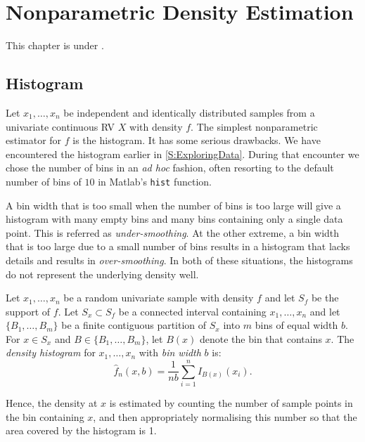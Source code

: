 \chapter{Nonparametric Density Estimation}
This chapter is under \work.
\section{Histogram}
Let $x_1,\ldots,x_n$ be independent and identically distributed samples from a univariate continuous RV $X$ with density $f$. The simplest nonparametric estimator for $f$ is the histogram.  It has some serious drawbacks.  We have encountered the histogram earlier in \ref{S:ExploringData}.  During that encounter we chose the number of bins in an {\em ad hoc} fashion, often resorting to the default number of bins of $10$ in {\sc Matlab}'s {\tt hist} function.

A bin width that is too small when the number of bins is too large will give a histogram with many empty bins and many bins containing only a single data point.  This is referred as {\em under-smoothing}.  At the other extreme, a bin width that is too large due to a small number of bins results in a histogram that lacks details and results in {\em over-smoothing}.  In both of these situations, the histograms do not represent the underlying density well.

\begin{definition}
Let $x_1,\ldots,x_n$ be a random univariate sample with density $f$ and let $S_f$ be the support of $f$. Let $S_x\subset S_f$ be a connected interval containing $x_1,\ldots,x_n$ and let $\{B_1,\ldots,B_m\}$ be a finite contiguous partition of $S_x$ into $m$ bins of equal width $b$. For $x\in S_x$ and $B\in \{B_1,\ldots,B_m\}$, let $B(x)$ denote the bin that contains $x$. The {\it density histogram} for $x_1,\ldots,x_n$ with {\it bin width} $b$ is:
\begin{equation}
\widehat{f}_n(x,b)=\frac{1}{nb}\sum^n_{i=1}I_{B(x)}(x_i).
\end{equation}
\end{definition}

Hence, the density at $x$ is estimated by counting the number of sample points in the bin containing $x$, and then appropriately normalising this number so that the area covered by the histogram is 1.


